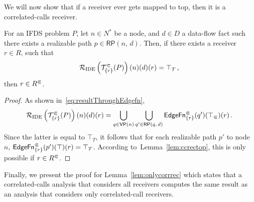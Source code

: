 We will now show that if a receiver ever gets mapped to top, then it is a correlated-calls receiver.

\begin{lemma}\label{lem:ccrectop}
   For an IFDS problem $P$, let $n\in N^*$ be a node, and $d\in D$ a data-flow fact such there exists a realizable path $p\in\textsf{RP}(n,\,d)$.
   Then, if there exists a receiver $r\in R$, such that
  \[
    \mathcal R_{\text{IDE}}\left(\mathcal T^\Subset_{\{r\}}(P)\right)(n)(d)(r)=\top_T\,,
  \]
  then $r\in {R^\Subset}$.
\end{lemma}
\begin{proof}
  As shown in~\eqref{eq:resultThroughEdgefn},
  \[
    \mathcal R_{\text{IDE}}\left(\mathcal T^\Subset_{\{r\}}(P)\right)(n)(d)(r)=\bigcup_{q\in\textsf{VP}(n)}\bigcup_{q'\in\mathsf{RP}(q,\,d)}\textsf{EdgeFn}^\Subset_{\{r\}}(q')(\top_\Subset)(r)\,.
  \]
  Since the latter is equal to $\top_T$, it follows that for each realizable path $p'$ to node $n$, $\textsf{EdgeFn}^\Subset_{\{r\}}(p')(\top)(r)=\top_T$. According to~Lemma~\ref{lem:ccrectop}, this is only possible if $r\in{R^\Subset}$.
\end{proof}

Finally, we present the proof for Lemma~\ref{lem:onlycorrrec} which states that a correlated-calls analysis that considers all receivers computes the same result as an analysis that considers only correlated-call receivers.

